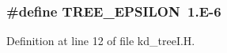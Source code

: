 \subsubsection[{\texorpdfstring{T\+R\+E\+E\+\_\+\+E\+P\+S\+I\+L\+ON}{TREE_EPSILON}}]{\setlength{\rightskip}{0pt plus 5cm}\#define T\+R\+E\+E\+\_\+\+E\+P\+S\+I\+L\+ON~1.E-\/6}\hypertarget{kd__treeI_8H_afe99b560aeec747790acc006750d892d}{}\label{kd__treeI_8H_afe99b560aeec747790acc006750d892d}


Definition at line 12 of file kd\+\_\+tree\+I.\+H.

